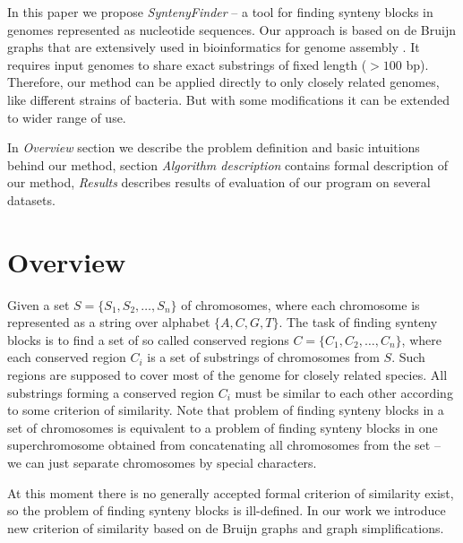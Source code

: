 \documentclass[a4paper, 12pt]{scrartcl}
\begin{document}
In this paper we propose \textit{SyntenyFinder} -- a tool for finding synteny blocks in genomes represented as nucleotide sequences.
Our approach is based on de Bruijn graphs that are extensively used in bioinformatics for genome assembly \cite{Pevzner2001, Iqbal2012}. 
It requires input genomes to share exact substrings of fixed length (\(> 100\) bp). Therefore, our method can be applied directly to only
closely related genomes, like different strains of bacteria. But with some modifications it can be extended to wider range of use.

In \textit{Overview} section we describe the problem definition and basic intuitions behind our method, section \textit{Algorithm description}
contains formal description of our method, \textit{Results} describes results of evaluation of our program on several datasets.

\section{Overview}

Given a set \(S = \lbrace S_{1}, S_{2}, \ldots, S_{n} \rbrace \) of chromosomes, where each
chromosome is represented as a string over alphabet \(\lbrace A, C, G, T \rbrace \). The task of finding synteny
blocks is to find a set of so called conserved regions \(C = \lbrace C_{1}, C_{2}, \ldots , C_{n} \rbrace \), where
each conserved region \(C_{i}\) is a set of substrings of chromosomes from \(S\). Such regions are supposed 
to cover most of the genome for closely related species.  All substrings forming a conserved region \(C_{i}\) must be
similar to each other according to some criterion of similarity. Note that problem of finding synteny blocks in a set
of chromosomes is equivalent to a problem of finding synteny blocks in one superchromosome
obtained from concatenating all chromosomes from the set -- we can just separate chromosomes by special characters.

At this moment there is no generally accepted formal criterion of similarity exist, so the problem of finding synteny blocks is ill-defined.
In our work we introduce new criterion of similarity based on de Bruijn graphs and graph simplifications.
\end{document}
